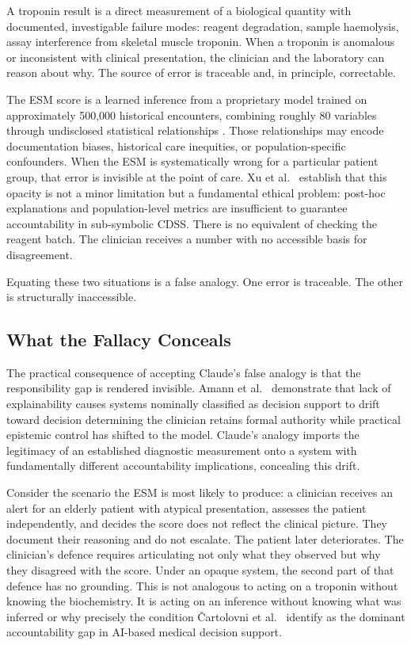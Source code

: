 \documentclass[]{UCD_CS_41820_Report}
\begin{document}
A troponin result is a direct measurement of a biological quantity with documented,
investigable failure modes: reagent degradation, sample haemolysis, assay
interference from skeletal muscle troponin. When a troponin is anomalous or
inconsistent with clinical presentation, the clinician and the laboratory can reason
about why. The source of error is traceable and, in principle, correctable.

The ESM score is a learned inference from a proprietary model trained on
approximately 500,000 historical encounters, combining roughly 80 variables through
undisclosed statistical relationships \cite{cull2023}. Those relationships may
encode documentation biases, historical care inequities, or population-specific
confounders. When the ESM is systematically wrong for a particular patient group,
that error is invisible at the point of care. Xu et al.\ \cite{xu2023} establish
that this opacity is not a minor limitation but a fundamental ethical problem:
post-hoc explanations and population-level metrics are insufficient to guarantee
accountability in sub-symbolic CDSS. There is no equivalent of checking the reagent
batch. The clinician receives a number with no accessible basis for disagreement.

Equating these two situations is a false analogy. One error is traceable. The other
is structurally inaccessible.

\subsection*{What the Fallacy Conceals}

The practical consequence of accepting Claude's false analogy is that the
responsibility gap is rendered invisible. Amann et al.\ \cite{amann2022} demonstrate
that lack of explainability causes systems nominally classified as decision support
to drift toward decision determining the clinician retains formal authority while
practical epistemic control has shifted to the model. Claude's analogy imports the
legitimacy of an established diagnostic measurement onto a system with fundamentally
different accountability implications, concealing this drift.

Consider the scenario the ESM is most likely to produce: a clinician receives an
alert for an elderly patient with atypical presentation, assesses the patient
independently, and decides the score does not reflect the clinical picture. They
document their reasoning and do not escalate. The patient later deteriorates. The
clinician's defence requires articulating not only what they observed but why they
disagreed with the score. Under an opaque system, the second part of that defence
has no grounding. This is not analogous to acting on a troponin without knowing the
biochemistry. It is acting on an inference without knowing what was inferred or why
precisely the condition \v{C}artolovni et al.\ \cite{cartoloni2022} identify as
the dominant accountability gap in AI-based medical decision support.
\end{document}
